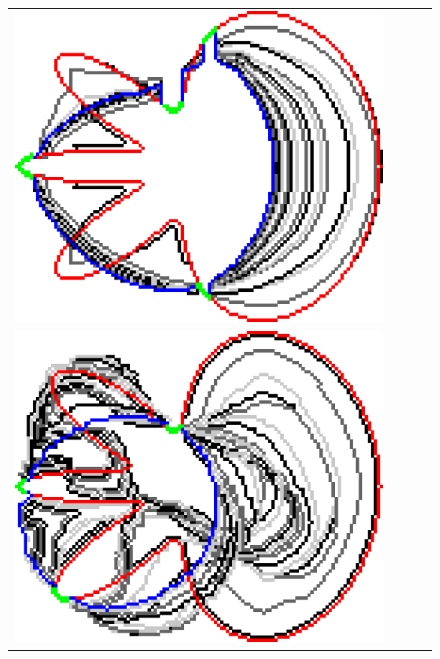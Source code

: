 \begin{figure}
\begin{tabular}{cccc}
\includegraphics[scale=0.25]{figures/chapter9/constrained-elastica/graphflow/flower-1/len_pen-0.0002/radius-15/N-1/h1.0/summary.pdf}\\
\includegraphics[scale=0.2]{figures/chapter9/constrained-elastica/localsearch/flower-2/len_pen-0.002/radius-15/nc-4/h1.0/summary.pdf} &

\end{tabular}
\end{figure}
